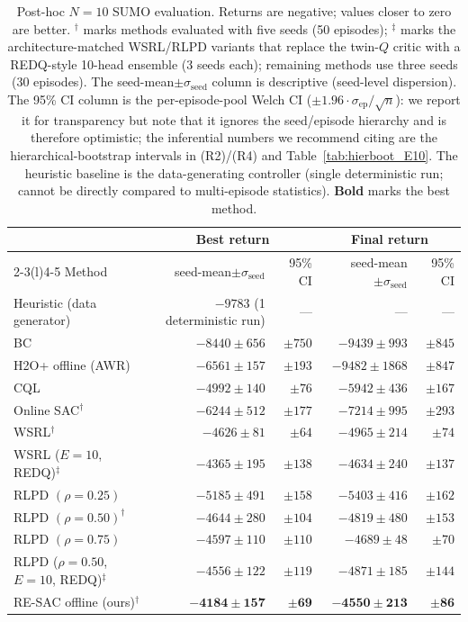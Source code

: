\documentclass[journal,10pt]{IEEEtran}
\begin{document}
\begin{table}[!t]
\centering
\caption{Post-hoc $N=10$ SUMO evaluation. Returns are negative; values closer to zero are better. $^\dagger$ marks methods evaluated with five seeds (50 episodes); $^\ddagger$ marks the architecture-matched WSRL/RLPD variants that replace the twin-$Q$ critic with a REDQ-style 10-head ensemble (3 seeds each); remaining methods use three seeds (30 episodes). The seed-mean$\pm\sigma_{\text{seed}}$ column is descriptive (seed-level dispersion). The 95\% CI column is the per-episode-pool Welch CI ($\pm 1.96 \cdot \sigma_{\text{ep}}/\sqrt{n}$): we report it for transparency but note that it ignores the seed/episode hierarchy and is therefore optimistic; the inferential numbers we recommend citing are the hierarchical-bootstrap intervals in (R2)/(R4) and Table~\ref{tab:hierboot_E10}. The heuristic baseline is the data-generating controller (single deterministic run; cannot be directly compared to multi-episode statistics). \textbf{Bold} marks the best method.}
\label{tab:main}
\small
\begin{tabular}{@{}lrrrr@{}}
\toprule
& \multicolumn{2}{c}{Best return} & \multicolumn{2}{c}{Final return} \\
\cmidrule(lr){2-3}\cmidrule(l){4-5}
Method & seed-mean$\pm\sigma_{\text{seed}}$ & 95\% CI & seed-mean$\pm\sigma_{\text{seed}}$ & 95\% CI \\
\midrule
Heuristic (data generator) & $-9783$ (1 deterministic run) & --- & --- & --- \\
BC                         & $-8440 \pm 656$  & $\pm 750$  & $-9439 \pm 993$  & $\pm 845$ \\
H2O+ offline (AWR)         & $-6561 \pm 157$  & $\pm 193$  & $-9482 \pm 1868$ & $\pm 847$ \\
CQL                        & $-4992 \pm 140$  & $\pm 76$   & $-5942 \pm 436$  & $\pm 167$ \\
Online SAC$^\dagger$       & $-6244 \pm 512$  & $\pm 177$  & $-7214 \pm 995$  & $\pm 293$ \\
WSRL$^\dagger$             & $-4626 \pm 81$   & $\pm 64$   & $-4965 \pm 214$  & $\pm 74$  \\
WSRL ($E{=}10$, REDQ)$^{\ddagger}$    & $-4365 \pm 195$  & $\pm 138$  & $-4634 \pm 240$  & $\pm 137$ \\
RLPD $(\rho=0.25)$         & $-5185 \pm 491$  & $\pm 158$  & $-5403 \pm 416$  & $\pm 162$ \\
RLPD $(\rho=0.50)^\dagger$ & $-4644 \pm 280$  & $\pm 104$  & $-4819 \pm 480$  & $\pm 153$ \\
RLPD $(\rho=0.75)$         & $-4597 \pm 110$  & $\pm 110$  & $-4689 \pm 48$   & $\pm 70$  \\
RLPD ($\rho{=}0.50$, $E{=}10$, REDQ)$^{\ddagger}$ & $-4556 \pm 122$ & $\pm 119$ & $-4871 \pm 185$ & $\pm 144$ \\
RE-SAC offline (ours)$^\dagger$ & $\mathbf{-4184 \pm 157}$ & $\mathbf{\pm 69}$ & $\mathbf{-4550 \pm 213}$ & $\mathbf{\pm 86}$ \\
\bottomrule
\end{tabular}
\end{table}
\end{document}
